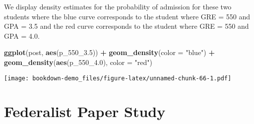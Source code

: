 \documentclass[
]{book}
\newenvironment{Shaded}{\begin{snugshade}}{\end{snugshade}}
\newcommand{\ControlFlowTok}[1]{\textcolor[rgb]{0.13,0.29,0.53}{\textbf{#1}}}
\newcommand{\DataTypeTok}[1]{\textcolor[rgb]{0.13,0.29,0.53}{#1}}
\newcommand{\DecValTok}[1]{\textcolor[rgb]{0.00,0.00,0.81}{#1}}
\newcommand{\FloatTok}[1]{\textcolor[rgb]{0.00,0.00,0.81}{#1}}
\newcommand{\KeywordTok}[1]{\textcolor[rgb]{0.13,0.29,0.53}{\textbf{#1}}}
\newcommand{\NormalTok}[1]{#1}
\newcommand{\OperatorTok}[1]{\textcolor[rgb]{0.81,0.36,0.00}{\textbf{#1}}}
\newcommand{\StringTok}[1]{\textcolor[rgb]{0.31,0.60,0.02}{#1}}
\begin{document}
\begin{Shaded}
\end{Shaded}

We display density estimates for the probability of admission for these two students where the blue curve corresponds to the student where GRE = 550 and GPA = 3.5 and the red curve corresponds to the student where GRE = 550 and GPA = 4.0.

\begin{Shaded}
\begin{Highlighting}[]
\KeywordTok{ggplot}\NormalTok{(post, }\KeywordTok{aes}\NormalTok{(p_}\DecValTok{550}\NormalTok{_}\FloatTok{3.5}\NormalTok{)) }\OperatorTok{+}
\StringTok{  }\KeywordTok{geom_density}\NormalTok{(}\DataTypeTok{color =} \StringTok{"blue"}\NormalTok{) }\OperatorTok{+}
\StringTok{  }\KeywordTok{geom_density}\NormalTok{(}\KeywordTok{aes}\NormalTok{(p_}\DecValTok{550}\NormalTok{_}\FloatTok{4.0}\NormalTok{),}
               \DataTypeTok{color =} \StringTok{"red"}\NormalTok{)}
\end{Highlighting}
\end{Shaded}

\texttt{[image: bookdown-demo\_files/figure-latex/unnamed-chunk-66-1.pdf]}

\hypertarget{federalist-paper-study}{%
\chapter{Federalist Paper Study}\label{federalist-paper-study}}
\end{document}
